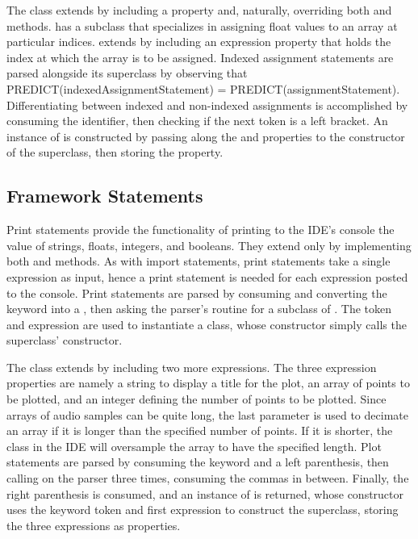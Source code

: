 The  class extends  by including a  property and, naturally, overriding both  and  methods.  has a subclass that specializes in assigning float values to an array at particular indices.  extends  by including an expression property that holds the index at which the array is to be assigned. Indexed assignment statements are parsed alongside its superclass by observing that PREDICT(indexedAssignmentStatement) = PREDICT(assignmentStatement). Differentiating between indexed and non-indexed assignments is accomplished by consuming the identifier, then checking if the next token is a left bracket. An instance of  is constructed by passing along the  and  properties to the constructor of the superclass, then storing the  property.

\subsection{Framework Statements}

Print statements provide the functionality of printing to the IDE's console the value of strings, floats, integers, and booleans. They extend  only by implementing both  and  methods. As with import statements, print statements take a single expression as input, hence a print statement is needed for each expression posted to the console. Print statements are parsed by consuming and converting the  keyword into a , then asking the parser's  routine for a subclass of . The token and expression are used to instantiate a  class, whose constructor simply calls the superclass' constructor.

The  class extends  by including two more expressions. The three expression properties are namely a string to display a title for the plot, an array of points to be plotted, and an integer defining the number of points to be plotted. Since arrays of audio samples can be quite long, the last parameter is used to decimate an array if it is longer than the specified number of points. If it is shorter, the  class in the IDE will oversample the array to have the specified length. Plot statements are parsed by consuming the keyword and a left parenthesis, then calling  on the parser three times, consuming the commas in between. Finally, the right parenthesis is consumed, and an instance of  is returned, whose constructor uses the keyword token and first expression to construct the superclass, storing the three expressions as properties.

